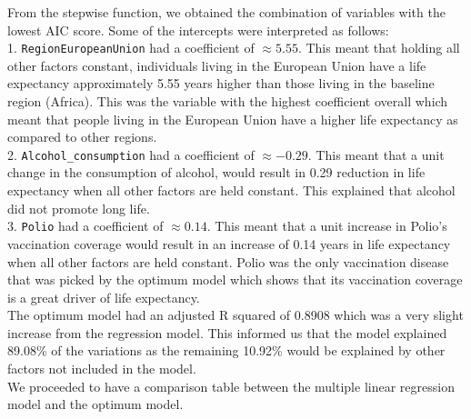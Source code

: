 \documentclass[
  10pt,
]{article}
\begin{document}
From the stepwise function, we obtained the combination of variables
with the lowest AIC score. Some of the intercepts were interpreted as
follows:\\
1. \texttt{RegionEuropeanUnion} had a coefficient of \(\approx 5.55\).
This meant that holding all other factors constant, individuals living
in the European Union have a life expectancy approximately 5.55 years
higher than those living in the baseline region (Africa). This was the
variable with the highest coefficient overall which meant that people
living in the European Union have a higher life expectancy as compared
to other regions.\\
2. \texttt{Alcohol\_consumption} had a coefficient of \(\approx -0.29\).
This meant that a unit change in the consumption of alcohol, would
result in 0.29 reduction in life expectancy when all other factors are
held constant. This explained that alcohol did not promote long life.\\
3. \texttt{Polio} had a coefficient of \(\approx 0.14\). This meant that
a unit increase in Polio's vaccination coverage would result in an
increase of 0.14 years in life expectancy when all other factors are
held constant. Polio was the only vaccination disease that was picked by
the optimum model which shows that its vaccination coverage is a great
driver of life expectancy.\\

The optimum model had an adjusted R squared of 0.8908 which was a very
slight increase from the regression model. This informed us that the
model explained 89.08\% of the variations as the remaining 10.92\% would
be explained by other factors not included in the model.\\

We proceeded to have a comparison table between the multiple linear
regression model and the optimum model.\\
\end{document}
